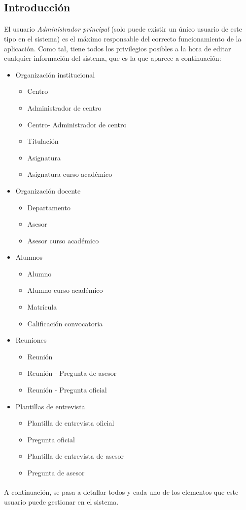 \subsection{Introducción}

  \paragraph{}El usuario \textit{Administrador principal} (solo puede existir un
  único usuario de este tipo en el sistema) es el máximo responsable del
  correcto funcionamiento de la aplicación. Como tal, tiene todos los
  privilegios posibles a la hora de editar cualquier información del sistema,
  que es la que aparece a continuación:

  \begin{itemize}
    \item Organización institucional
    \begin{itemize}
      \item Centro
      \item Administrador de centro
      \item Centro- Administrador de centro
      \item Titulación
      \item Asignatura
      \item Asignatura curso académico
    \end{itemize}
   \item Organización docente
   \begin{itemize}
      \item Departamento
      \item Asesor
      \item Asesor curso académico
   \end{itemize}
   \item Alumnos
   \begin{itemize}
      \item Alumno
      \item Alumno curso académico
      \item Matrícula
      \item Calificación convocatoria
   \end{itemize}
   \item Reuniones
   \begin{itemize}
      \item Reunión
      \item Reunión - Pregunta de asesor
      \item Reunión - Pregunta oficial
   \end{itemize}
   \item Plantillas de entrevista
   \begin{itemize}
      \item Plantilla de entrevista oficial
      \item Pregunta oficial
      \item Plantilla de entrevista de asesor
      \item Pregunta de asesor
   \end{itemize}
  \end{itemize}

  \paragraph{}A continuación, se pasa a detallar todos y cada uno de los
  elementos que este usuario puede gestionar en el sistema.

